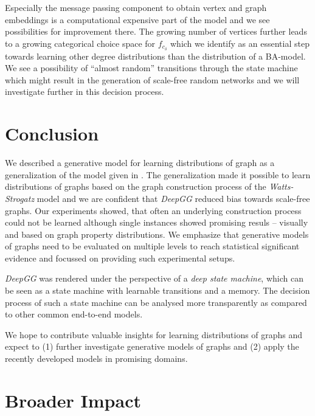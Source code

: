 \documentclass{article}
\begin{document}
Especially the message passing component to obtain vertex and graph embeddings is a computational expensive part of the model and we see possibilities for improvement there.
The growing number of vertices further leads to a growing categorical choice space for $f_{c_{\delta}}$ which we identify as an essential step towards learning other degree distributions than the distribution of a BA-model.
We see a possibility of ``almost random'' transitions through the state machine which might result in the generation of scale-free random networks and we will investigate further in this decision process.

 \section{Conclusion}\label{sec:conclusion}
We described a generative model for learning distributions of graph as a generalization of the model given in \cite{li2018learning}.
The generalization made it possible to learn distributions of graphs based on the graph construction process of the \textit{Watts-Strogatz} model and we are confident that \textit{DeepGG} reduced bias towards scale-free graphs.
Our experiments showed, that often an underlying construction process could not be learned although single instances showed promising resuls -- visually and based on graph property distributions.
We emphasize that generative models of graphs need to be evaluated on multiple levels to reach statistical significant evidence and focussed on providing such experimental setups.

\textit{DeepGG} was rendered under the perspective of a \textit{deep state machine}, which can be seen as a state machine with learnable transitions and a memory.
The decision process of such a state machine can be analysed more transparently as compared to other common end-to-end models.

We hope to contribute valuable insights for learning distributions of graphs and expect to (1) further investigate generative models of graphs and (2) apply the recently developed models in promising domains.
  
\section*{Broader Impact}
\end{document}
